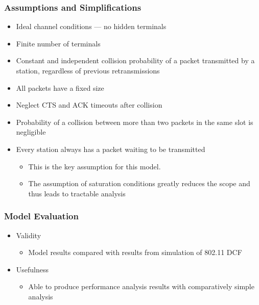 \subsubsection{Assumptions and Simplifications}\label{subsubsec:Bianchi_Model_Assumptions}
\begin{itemize}[noitemsep]
\item Ideal channel conditions — no hidden terminals
\item Finite number of terminals
\item Constant and independent collision probability of a packet transmitted by a station, regardless of previous retransmissions
\item All packets have a fixed size
\item Neglect CTS and ACK timeouts after collision
\item Probability of a collision between more than two packets in the same slot is negligible
\item Every station always has a packet waiting to be transmitted
  \begin{itemize}[noitemsep]
  \item This is the key assumption for this model.
  \item The assumption of saturation conditions greatly reduces the
    scope and thus leads to tractable analysis
  \end{itemize}
\end{itemize}

\subsubsection{Model Evaluation}\label{subsubsec:Bianchi_Model_Eval}
\begin{itemize}[noitemsep]
\item Validity
  \begin{itemize}[noitemsep]
  \item Model results compared with results from simulation of 802.11 DCF
  \end{itemize}

\item Usefulness
  \begin{itemize}[noitemsep]
  \item Able to produce performance analysis results with comparatively simple analysis
  \end{itemize}
\end{itemize}


